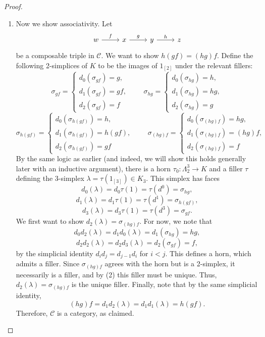 \begin{proof}
\begin{enumerate}
		\item Now we show associativity. Let
			\[\begin{tikzcd}[row sep = 2.5em, column sep = 2.5em]
			w\ar[" f ", r]  & x\ar[" g ", r]  & y\ar[" h ", r]  & z
			\end{tikzcd}\]
			be a composable triple in $\mathcal{C} $. We want to show $h(gf)=(hg)f$. Define the following 2-simplices of $K$ to be the images of $1_{[2]} $ under the relevant fillers:
    \[
        \sigma_{gf} =\left\{ 
        \begin{matrix}
            d_0(\sigma_{gf} )=g,\\
            d_1(\sigma _{gf} )=gf,\\
            d_2(\sigma _{gf} )=f
        \end{matrix}
        \right. \qquad
        \sigma_{hg} =\left\{ 
        \begin{matrix}
            d_0(\sigma_{hg} )=h,\\
            d_1(\sigma _{hg} )=hg,\\
            d_2(\sigma _{hg} )=g
        \end{matrix}
        \right.
    \]
    \[
        \sigma_{h(gf)} =\left\{ 
        \begin{matrix}
            d_0(\sigma_{h(gf)} )=h,\\
            d_1(\sigma _{h(gf)} )=h(gf),\\
            d_2(\sigma _{h(gf)} )=gf
        \end{matrix}
        \right. \qquad
        \sigma_{(hg)f} =\left\{ 
        \begin{matrix}
            d_0(\sigma_{(hg)f} )=hg,\\
            d_1(\sigma _{(hg)f} )=(hg)f,\\
            d_2(\sigma _{(hg)f} )=f
        \end{matrix}
        \right.
  		  \]
		  By the same logic as earlier (and indeed, we will show this holds generally later with an inductive argument), there is a horn $\tau_0 : \Lambda_2^3 \to K$ and a filler $\tau$ defining the 3-simplex $\lambda=\tau(1_{[3]} )\in K_3$. This simplex has faces
		  \[
		  	d_0(\lambda)=d_0\tau(1)=\tau(d^0)=\sigma_{hg} ,
		  \]
		  \[
		  	d_1(\lambda)=d_1\tau(1)=\tau(d^1)=\sigma_{h(gf)} ,
		  \]
		  \[
		  	d_3(\lambda)=d_3\tau(1)=\tau(d^3)=\sigma_{gf} 
		  .\]
		  We first want to show $d_2(\lambda)=\sigma_{(hg)f} $. For now, we note that
		  \[
		  	d_0d_2(\lambda)=d_1d_0(\lambda)=d_1(\sigma_{hg} )=hg,
		  \]
		  \[
		  	d_2d_2(\lambda)=d_2d_3(\lambda)=d_2(\sigma_{gf} )=f,
		  \]
		  by the simplicial identity $d_id_j=d_{j-1} d_i$ for $i<j$. This defines a horn, which admits a filler. Since $\sigma_{(hg)f} $ agrees with the horn but is a 2-simplex, it necessarily is a filler, and by (2) this filler must be unique. Thus, $d_2(\lambda)=\sigma_{(hg)f} $ is the unique filler. Finally, note that by the same simplicial identity,
		  \[
			  (hg)f=d_1d_2(\lambda)=d_1d_1(\lambda)=h(gf)
		  .\]
		  Therefore, $\mathcal{C} $ is a category, as claimed.
	\end{enumerate}


\end{proof}
